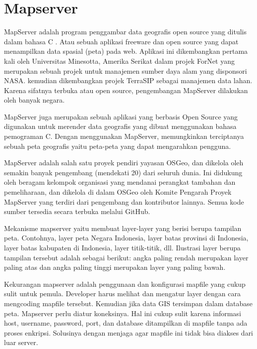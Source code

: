 \section{Mapserver}
MapServer adalah program penggambar data geografis open source yang ditulis
dalam bahasa C \cite{akbar2011peningkatan}. Atau sebuah aplikasi freeware dan open source yang dapat menampilkan data spasial (peta) pada web. Aplikasi ini dikembangkan pertama kali oleh Universitas Minesotta, Amerika Serikat dalam projek ForNet yang merupakan sebuah projek untuk manajemen sumber daya alam yang disponsori NASA. kemudian dikembangkan projek TerraSIP sebagai manajemen data lahan. Karena sifatnya terbuka atau open source, pengembangan MapServer dilakukan oleh banyak negara.

 MapServer juga merupakan sebuah aplikasi yang berbasis Open Source yang digunakan untuk merender data geografis yang dibuat menggunakan bahasa pemograman C. Dengan menggunakan MapServer, memungkinkan terciptanya sebuah peta geografis yaitu peta-peta yang dapat mengarahkan pengguna.

MapServer adalah salah satu proyek pendiri yayasan OSGeo, dan dikelola oleh semakin banyak pengembang (mendekati 20) dari seluruh dunia. Ini didukung oleh beragam kelompok organisasi yang mendanai perangkat tambahan dan pemeliharaan, dan dikelola di dalam OSGeo oleh Komite Pengarah Proyek MapServer yang terdiri dari pengembang dan kontributor lainnya. Semua kode sumber tersedia secara terbuka melalui GitHub.

Mekanisme mapserver yaitu membuat layer-layer yang berisi berupa tampilan peta. Contohnya, layer peta Negara Indonesia, layer batas provinsi di Indonesia, layer batas kabupaten di Indonesia, layer titik-titik, dll. Ilustrasi layer berupa tampilan tersebut adalah sebagai berikut: angka paling rendah merupakan layer paling atas dan angka paling tinggi merupakan layer yang paling bawah.

Kekurangan mapserver adalah penggunaan dan konfigurasi mapfile yang cukup sulit untuk pemula. Developer harus melihat dan mengatur layer dengan cara mengcoding mapfile tersebut. Kemudian jika data GIS tersimpan dalam database peta. Mapserver perlu diatur koneksinya. Hal ini cukup sulit karena informasi host, username, password, port, dan database ditampilkan di mapfile tanpa ada proses enkripsi. Solusinya dengan menjaga agar mapfile ini tidak bisa diakses dari luar server.

